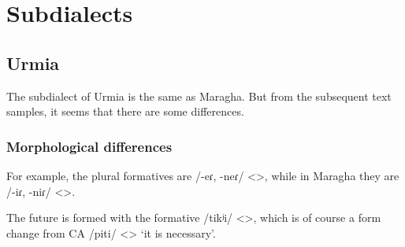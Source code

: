 \begin{table}[H]
	\centering 
	\caption{Participles or converbs <> in the Maragha dialect}
	\label{tab:Maragha:morpho:verb:paradigm:participle}
\end{table}






\begin{adjarianpage}\label{page:284}\end{adjarianpage}%

\section{Subdialects}
\subsection{Urmia}
The subdialect of Urmia is the same as Maragha. But from the subsequent text samples, it seems that there are some differences. 

\subsubsection{Morphological differences}

For example, the plural formatives are /-eɾ, -neɾ/ <>, while in Maragha they are /-iɾ, -niɾ/ <>. 

The future is formed with the formative /tikʲi/ <>, which is of course a form change from CA /piti/ <> `it is necessary'. 
